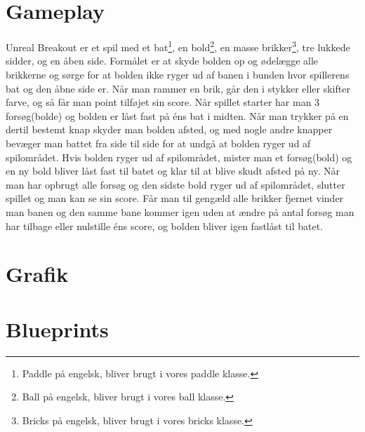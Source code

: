
\section{Gameplay}
Unreal Breakout er et spil med et bat\footnote{Paddle på engelsk, bliver brugt i vores paddle klasse.}, en bold\footnote{Ball på engelsk, bliver brugt i vores ball klasse.}, en masse brikker\footnote{Bricks på engelsk, bliver brugt i vores bricks klasse.}, tre lukkede sidder, og en åben side. Formålet er at skyde bolden op og ødelægge alle brikkerne og sørge for at bolden ikke ryger ud af banen i bunden hvor spillerens bat og den åbne side er. Når man rammer en brik, går den i stykker eller skifter farve, og så får man point tilføjet sin score. Når spillet starter har man 3 forsøg(bolde) og bolden er låst fast på éns bat i midten. Når man trykker på en dertil bestemt knap skyder man bolden afsted, og med nogle andre knapper bevæger man battet fra side til side for at undgå at bolden ryger ud af spilområdet. Hvis bolden ryger ud af spilområdet, mister man et forsøg(bold) og en ny bold bliver låst fast til batet og klar til at blive skudt afsted på ny. Når man har opbrugt alle forsøg og den sidste bold ryger ud af spilområdet, slutter spillet og man kan se sin score. Får man til gengæld alle brikker fjernet vinder man banen og den samme bane kommer igen uden at ændre på antal forsøg man har tilbage eller nulstille éns score, og bolden bliver igen fastlåst til batet.

\section{Grafik}

\section{Blueprints}